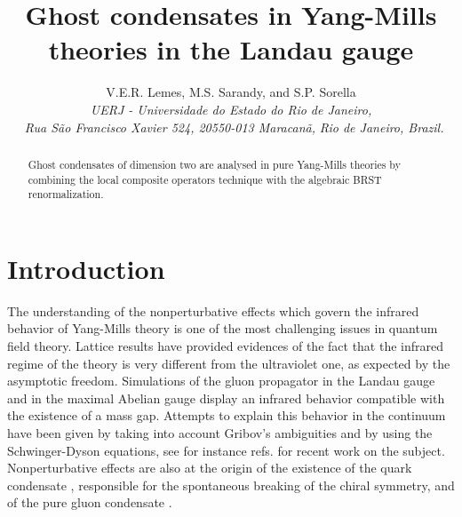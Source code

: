 \documentclass[a4paper,12pt]{article}
\begin{document}
\title{\textbf{Ghost condensates in Yang-Mills theories in the Landau gauge }}
\author{V.E.R. Lemes, M.S. Sarandy, and S.P. Sorella \\
{\small {\textit{UERJ - Universidade do Estado do Rio de Janeiro,}}} \\
{\small {\textit{\ Rua S\~{a}o Francisco Xavier 524, 20550-013 Maracan\~{a}, 
}}} {\small {\textit{Rio de Janeiro, Brazil.}}}}
\maketitle

\begin{abstract}
Ghost condensates of dimension two are analysed in pure \coordHE{} Yang-Mills
theories by combining the local composite operators technique with the
algebraic BRST renormalization.
\end{abstract}

\vfill\newpage

\section{Introduction}

The understanding of the nonperturbative effects which govern the infrared
behavior of Yang-Mills theory is one of the most challenging issues in
quantum field theory. Lattice results have provided evidences of the fact
that the infrared regime of the theory is very different from the
ultraviolet one, as expected by the asymptotic freedom. Simulations of the
gluon propagator in the Landau gauge \cite{lg} and in the maximal Abelian
gauge \cite{as} display an infrared behavior compatible with the existence
of a mass gap. Attempts to explain this behavior in the continuum have been
given by taking into account Gribov's ambiguities and by using the
Schwinger-Dyson equations, see for instance refs.\cite{zw,sd} for recent
work on the subject. Nonperturbative effects are also at the origin of the
existence of the quark condensate \coordHE{}%
, responsible for the spontaneous breaking of the chiral symmetry, and of
the pure gluon condensate \coordHE{}.
\end{document}
